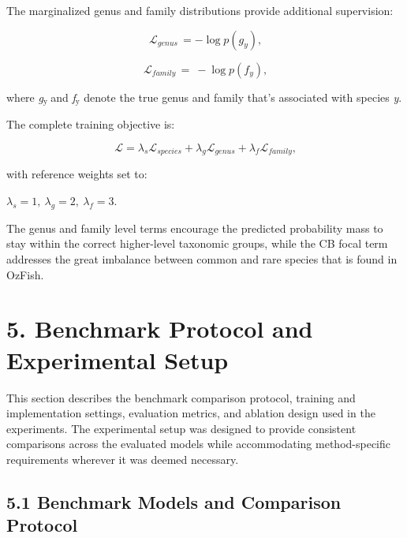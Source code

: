 \documentclass[preprint,12pt]{elsarticle}
\providecommand{\textsubscript}[1]{\ensuremath{_{\text{#1}}}}
\begin{document}
The marginalized genus and family distributions provide additional
supervision:

\begin{equation}
\mathcal{L}_{genus\ } = - \log{p\left( g_{y} \right)}\text{,}
\end{equation}

\begin{equation}
\mathcal{L}_{family\ } = \  - \log{p\left( f_{y} \right)}\text{,}
\end{equation}

where \emph{g\textsubscript{y }}and \emph{f\textsubscript{y}} denote the
true genus and family that's associated with species \emph{y}.

The complete training objective is:

\begin{equation}
\mathcal{L =}\lambda_{s}\mathcal{L}_{species} + \lambda_{g}\mathcal{L}_{genus} + \lambda_{f}\mathcal{L}_{family}\text{,}
\end{equation}

with reference weights set to:

\(\lambda_{s} = 1,\ \lambda_{g} = 2,\ \lambda_{f} = 3\).

The genus and family level terms encourage the predicted probability
mass to stay within the correct higher-level taxonomic groups, while the
CB focal term addresses the great imbalance between common and rare
species that is found in OzFish.

\section*{5. Benchmark Protocol and Experimental
Setup}\label{benchmark-protocol-and-experimental-setup}

This section describes the benchmark comparison protocol, training and
implementation settings, evaluation metrics, and ablation design used in
the experiments. The experimental setup was designed to provide
consistent comparisons across the evaluated models while accommodating
method-specific requirements wherever it was deemed necessary.

\subsection*{5.1 Benchmark Models and Comparison
Protocol}\label{benchmark-models-and-comparison-protocol}
\end{document}
